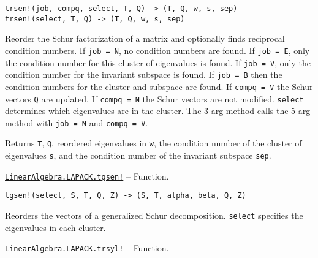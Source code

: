 \begin{adjustwidth}{2em}{0pt}


\begin{verbatim}
trsen!(job, compq, select, T, Q) -> (T, Q, w, s, sep)
trsen!(select, T, Q) -> (T, Q, w, s, sep)
\end{verbatim}

Reorder the Schur factorization of a matrix and optionally finds reciprocal condition numbers. If \texttt{job = N}, no condition numbers are found. If \texttt{job = E}, only the condition number for this cluster of eigenvalues is found. If \texttt{job = V}, only the condition number for the invariant subspace is found. If \texttt{job = B} then the condition numbers for the cluster and subspace are found. If \texttt{compq = V} the Schur vectors \texttt{Q} are updated. If \texttt{compq = N} the Schur vectors are not modified. \texttt{select} determines which eigenvalues are in the cluster. The 3-arg method calls the 5-arg method with \texttt{job = N} and \texttt{compq = V}.

Returns \texttt{T}, \texttt{Q}, reordered eigenvalues in \texttt{w}, the condition number of the cluster of eigenvalues \texttt{s}, and the condition number of the invariant subspace \texttt{sep}.



\end{adjustwidth}
\hypertarget{4226534331460521506}{}
\hyperlink{4226534331460521506}{\texttt{LinearAlgebra.LAPACK.tgsen!}}  -- {Function.}

\begin{adjustwidth}{2em}{0pt}


\begin{verbatim}
tgsen!(select, S, T, Q, Z) -> (S, T, alpha, beta, Q, Z)
\end{verbatim}

Reorders the vectors of a generalized Schur decomposition. \texttt{select} specifies the eigenvalues in each cluster.



\end{adjustwidth}
\hypertarget{853281004697696312}{}
\hyperlink{853281004697696312}{\texttt{LinearAlgebra.LAPACK.trsyl!}}  -- {Function.}

